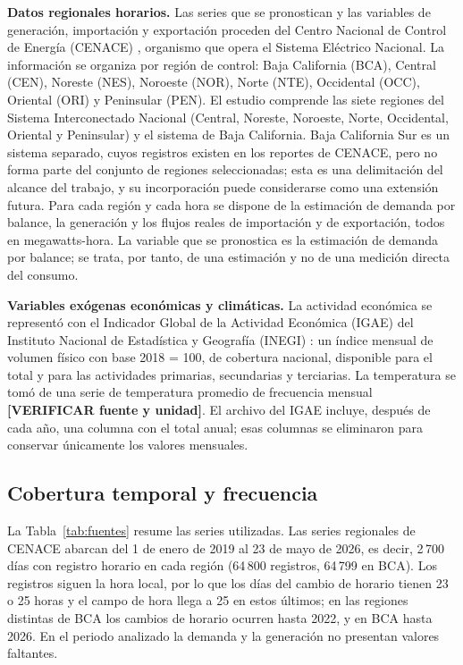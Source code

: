 \textbf{Datos regionales horarios.} Las series que se pronostican y las variables de generación, importación y exportación proceden del Centro Nacional de Control de Energía (CENACE) \cite{CENACE_DemandaReal}, organismo que opera el Sistema Eléctrico Nacional. La información se organiza por región de control: Baja California (BCA), Central (CEN), Noreste (NES), Noroeste (NOR), Norte (NTE), Occidental (OCC), Oriental (ORI) y Peninsular (PEN). El estudio comprende las siete regiones del Sistema Interconectado Nacional (Central, Noreste, Noroeste, Norte, Occidental, Oriental y Peninsular) y el sistema de Baja California. Baja California Sur es un sistema separado, cuyos registros existen en los reportes de CENACE, pero no forma parte del conjunto de regiones seleccionadas; esta es una delimitación del alcance del trabajo, y su incorporación puede considerarse como una extensión futura. Para cada región y cada hora se dispone de la estimación de demanda por balance, la generación y los flujos reales de importación y de exportación, todos en megawatts-hora. La variable que se pronostica es la estimación de demanda por balance; se trata, por tanto, de una estimación y no de una medición directa del consumo.

\textbf{Variables exógenas económicas y climáticas.} La actividad económica se representó con el Indicador Global de la Actividad Económica (IGAE) del Instituto Nacional de Estadística y Geografía (INEGI) \cite{INEGI_IGAE}: un índice mensual de volumen físico con base 2018 = 100, de cobertura nacional, disponible para el total y para las actividades primarias, secundarias y terciarias. La temperatura se tomó de una serie de temperatura promedio de frecuencia mensual \cite{TEMPERATURA} \textbf{[VERIFICAR fuente y unidad]}. El archivo del IGAE incluye, después de cada año, una columna con el total anual; esas columnas se eliminaron para conservar únicamente los valores mensuales.

\subsection{Cobertura temporal y frecuencia}

La Tabla~\ref{tab:fuentes} resume las series utilizadas. Las series regionales de CENACE abarcan del 1 de enero de 2019 al 23 de mayo de 2026, es decir, 2\,700 días con registro horario en cada región (64\,800 registros, 64\,799 en BCA). Los registros siguen la hora local, por lo que los días del cambio de horario tienen 23 o 25 horas y el campo de hora llega a 25 en estos últimos; en las regiones distintas de BCA los cambios de horario ocurren hasta 2022, y en BCA hasta 2026. En el periodo analizado la demanda y la generación no presentan valores faltantes.

